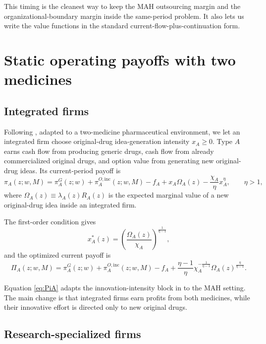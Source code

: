 \documentclass[12pt]{article}
\newcommand{\1}{\mathbf{1}}
\begin{document}
This timing is the cleanest way to keep the MAH outsourcing margin and the organizational-boundary margin inside the same-period problem. It also lets us write the value functions in the standard current-flow-plus-continuation form.

\section{Static operating payoffs with two medicines}

\subsection{Integrated firms}

Following \citet{KletteKortum2004}, adapted to a two-medicine pharmaceutical environment, we let an integrated firm choose original-drug idea-generation intensity $x_A\ge 0$. Type $A$ earns cash flow from producing generic drugs, cash flow from already commercialized original drugs, and option value from generating new original-drug ideas. Its current-period payoff is
\begin{equation}
\pi_A(z;w,M)
=
\pi_A^G(z;w)
+\pi_A^{O,\mathrm{inc}}(z;w,M)
-f_A
+x_A\Omega_A(z)-\frac{\chi_A}{\eta}x_A^{\eta},
\qquad \eta>1,
\label{eq:piA}
\end{equation}
where $\Omega_A(z)\equiv \lambda_A(z)R_A(z)$ is the expected marginal value of a new original-drug idea inside an integrated firm.

The first-order condition gives
\begin{equation}
x_A^*(z)=\left(\frac{\Omega_A(z)}{\chi_A}\right)^{\frac{1}{\eta-1}},
\label{eq:xA}
\end{equation}
and the optimized current payoff is
\begin{equation}
\Pi_A(z;w,M)
=
\pi_A^G(z;w)
+\pi_A^{O,\mathrm{inc}}(z;w,M)
-f_A
+
\frac{\eta-1}{\eta}\chi_A^{-\frac{1}{\eta-1}}\Omega_A(z)^{\frac{\eta}{\eta-1}}.
\label{eq:PiA}
\end{equation}

Equation \eqref{eq:PiA} adapts the innovation-intensity block in \citet{KletteKortum2004} to the MAH setting. The main change is that integrated firms earn profits from both medicines, while their innovative effort is directed only to new original drugs.

\subsection{Research-specialized firms}
\end{document}
